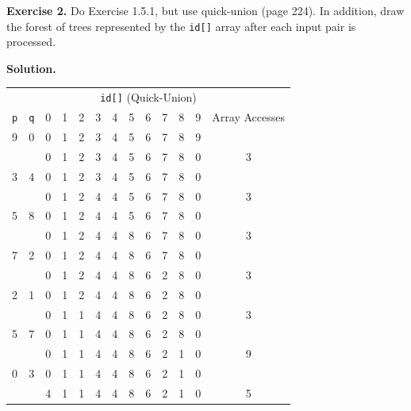 \documentclass[12pt, a4paper]{article}
\newenvironment{ex}[2][Exercise]
{\par\medskip\noindent \textbf{#1 #2.}}
{\medskip}
\newenvironment{sol}[1][Solution]
{\par\medskip\noindent \textbf{#1.} }
{\medskip}
\begin{document}
	\begin{ex}{2}
		Do Exercise 1.5.1, but use quick-union (page 224). In addition, draw the forest of trees
		represented by the \texttt{id[]} array after each input pair is processed.
	\end{ex}
	\begin{sol}
		\begin{center}
			\begin{tabular}{cc|cccccccccc|c}
				\multicolumn{13}{c}{\texttt{id[]} (Quick-Union)}\\
				\texttt{p} & \texttt{q} & 0 & 1 & 2 & 3 & 4 & 5 & 6 & 7 & 8 & 9 & Array Accesses\\
				\hline
				9  & 0  & {\color{green} 0} & 1 & 2 & 3 & 4 & 5 & 6 & 7 & 8 & {\color{green} 9} & {}\\
				{} & {} & 0 & 1 & 2 & 3 & 4 & 5 & 6 & 7 & 8 & {\color{red} 0} & 3\\
				
				3  & 4  & 0 & 1 & 2 & {\color{green} 3} & {\color{green} 4} & 5 & 6 & 7 & 8 & 0 & {}\\
				{} & {} & 0 & 1 & 2 & {\color{red} 4} & 4 & 5 & 6 & 7 & 8 & 0 & 3\\
				
				5  & 8  & 0 & 1 & 2 & 4 & 4 & {\color{green} 5} & 6 & 7 & {\color{green} 8} & 0 & {}\\
				{} & {} & 0 & 1 & 2 & 4 & 4 & {\color{red} 8} & 6 & 7 & 8 & 0 & 3\\
				
				7  & 2  & 0 & 1 & {\color{green} 2} & 4 & 4 & 8 & 6 & {\color{green} 7} & 8 & 0 & {}\\
				{} & {} & 0 & 1 & 2 & 4 & 4 & 8 & 6 & {\color{red} 2} & 8 & 0 & 3\\
				
				2  & 1  & 0 & {\color{green} 1} & {\color{green} 2} & 4 & 4 & 8 & 6 & {\color{green} 2} & 8 & 0 & {}\\
				{} & {} & 0 & 1 & {\color{red} 1} & 4 & 4 & 8 & 6 & 2 & 8 & 0 & 3\\
				
				5  & 7  & 0 & {\color{green} 1} & {\color{green} 1} & 4 & 4 & {\color{green} 8} & 6 & {\color{green} 2} & {\color{green} 8} & 0 & {}\\
				{} & {} & 0 & 1 & 1 & 4 & 4 & 8 & 6 & 2 & {\color{red} 1} & 0 & 9\\
				
				0  & 3  & {\color{green}0} & 1 & 1 & {\color{green} 4} & {\color{green} 4} & 8 & 6 & 2 & 1 & {\color{green} 0} & {}\\
				{} & {} & {\color{red} 4} & 1 & 1 & 4 & 4 & 8 & 6 & 2 & 1 & 0 & 5\\
				

\end{tabular}
\end{center}
\end{sol}
\end{document}
